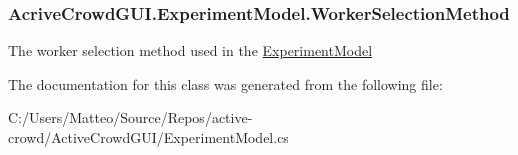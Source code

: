 \subsubsection[{Worker\+Selection\+Method}]{ Acrive\+Crowd\+G\+U\+I.\+Experiment\+Model.\+Worker\+Selection\+Method\hspace{0.3cm}{\ttfamily [get]}}\label{class_acrive_crowd_g_u_i_1_1_experiment_model_ac16067088de0e358eca610efad0fba17}


The worker selection method used in the \hyperlink{class_acrive_crowd_g_u_i_1_1_experiment_model}{Experiment\+Model} 



The documentation for this class was generated from the following file\+:\begin{DoxyCompactItemize}
\item 
C\+:/\+Users/\+Matteo/\+Source/\+Repos/active-\/crowd/\+Active\+Crowd\+G\+U\+I/Experiment\+Model.\+cs\end{DoxyCompactItemize}
